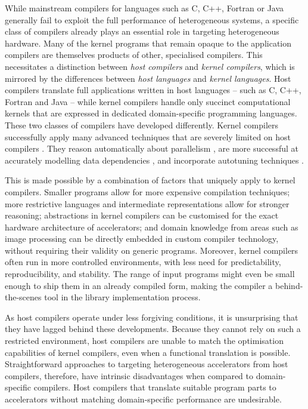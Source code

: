     While mainstream compilers for languages such as C, C++, Fortran or Java
    generally fail to exploit the full performance of heterogeneous systems, a
    specific class of compilers already plays an essential role in
    targeting heterogeneous hardware.
    Many of the kernel programs that remain opaque to the application compilers
    are themselves products of other, specialised compilers.
    This necessitates a distinction between {\em host compilers} and {\em kernel
    compilers}, which is mirrored by the differences between
    {\em host languages} and {\em kernel languages}.
    Host compilers translate full applications written in host languages -- such
    as C, C++, Fortran and Java -- while kernel compilers handle only succinct
    computational kernels that are expressed in dedicated domain-specific
    programming languages.
    These two classes of compilers have developed differently.
    Kernel compilers successfully apply many advanced techniques that are
    severely limited on host compilers
    \citep{Murphy2014LimitsOD,Maleki:2011:EVC:2120965.2121464}.
    They reason automatically about parallelism
    \citep{Steuwer:2017:LFD:3049832.3049841}, are more successful at accurately
    modelling data dependencies \cite{Ragan-Kelley2013Halide}, and incorporate
    autotuning techniques \citep{Ansel:2014:OEF:2628071.2628092}.

    This is made possible by a combination of factors that uniquely apply to
    kernel compilers.
    Smaller programs allow for more expensive compilation techniques;
    more restrictive languages and intermediate representations allow for
    stronger reasoning;
    abstractions in kernel compilers can be customised for the exact hardware
    architecture of accelerators;
    and domain knowledge from areas such as image processing can be directly
    embedded in custom compiler technology, without requiring their validity
    on generic programs.
    Moreover, kernel compilers often run in more controlled environments,
    with less need for predictability, reproducibility, and stability.
    The range of input programs might even be small enough to ship them in an
    already compiled form, making the compiler a behind-the-scenes tool in the
    library implementation process.

    As host compilers operate under less forgiving conditions, it is
    unsurprising that they have lagged behind these developments.
    Because they cannot rely on such a restricted environment, host compilers
    are unable to match the optimisation capabilities of kernel compilers, even
    when a functional translation is possible.
    Straightforward approaches to targeting heterogeneous accelerators from host
    compilers, therefore, have intrinsic disadvantages when compared to
    domain-specific compilers.
    Host compilers that translate suitable program parts to accelerators without
    matching domain-specific performance are undesirable.

